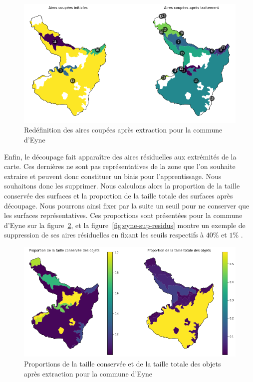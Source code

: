 \begin{figure}[!h]
    \centering
    \includegraphics[scale=0.5]{images/eyne-redef-aires}
    \caption{Redéfinition des aires coupées après extraction pour la commune d'Eyne}
    \label{fig:eyne-redef-aire}
\end{figure}



Enfin, le découpage fait apparaître des aires résiduelles aux extrémités de la carte.
Ces dernières ne sont pas représentatives de la zone que l'on souhaite extraire et peuvent donc constituer un biais pour l'apprentissage.
Nous souhaitons donc les supprimer.
Nous calculons alors la proportion de la taille conservée des surfaces et la proportion de la taille totale des surfaces après découpage.
Nous pourrons ainsi fixer par la suite un seuil pour ne conserver que les surfaces représentatives.
Ces proportions sont présentées pour la commune d'Eyne sur la figure~\ref{fig:eyne-residus-prop}, et la figure~\ref{fig:eyne-sup-residus} montre un exemple de suppression de ses aires résiduelles en fixant les seuils respectifs à $40\%$ et $1\%$ .


\begin{figure}[!h]
    \centering
    \includegraphics[scale=0.5]{images/eyne-residus-prop}
    \caption{Proportions de la taille conservée et de la taille totale des objets après extraction pour la commune d'Eyne}
    \label{fig:eyne-residus-prop}
\end{figure}


